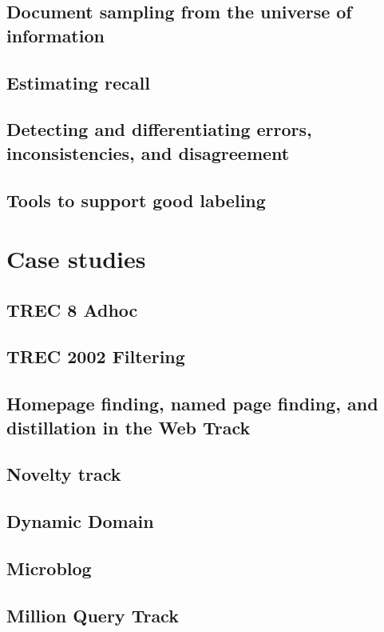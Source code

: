 \documentclass[nobib]{tufte-book}
\begin{document}
\section{Document sampling from the universe of information}
\section{Estimating recall}
\section{Detecting and differentiating errors, inconsistencies, and disagreement}
\section{Tools to support good labeling}

\chapter{Case studies}

\section{TREC 8 Adhoc}
\section{TREC 2002 Filtering}
\section{Homepage finding, named page finding, and distillation in the Web Track}
\section{Novelty track}
\section{Dynamic Domain}
\section{Microblog}
\section{Million Query Track}



\backmatter

\printbibliography

\printindex
\end{document}
